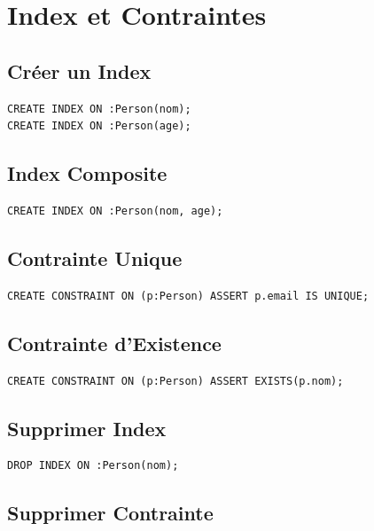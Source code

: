 \documentclass[11pt,a4paper]{article}
\begin{document}
\newpage

\section{Index et Contraintes}

\subsection{Créer un Index}

\begin{lstlisting}
CREATE INDEX ON :Person(nom);
CREATE INDEX ON :Person(age);
\end{lstlisting}

\subsection{Index Composite}

\begin{lstlisting}
CREATE INDEX ON :Person(nom, age);
\end{lstlisting}

\subsection{Contrainte Unique}

\begin{lstlisting}
CREATE CONSTRAINT ON (p:Person) ASSERT p.email IS UNIQUE;
\end{lstlisting}

\subsection{Contrainte d'Existence}

\begin{lstlisting}
CREATE CONSTRAINT ON (p:Person) ASSERT EXISTS(p.nom);
\end{lstlisting}

\subsection{Supprimer Index}

\begin{lstlisting}
DROP INDEX ON :Person(nom);
\end{lstlisting}

\subsection{Supprimer Contrainte}
\end{document}
